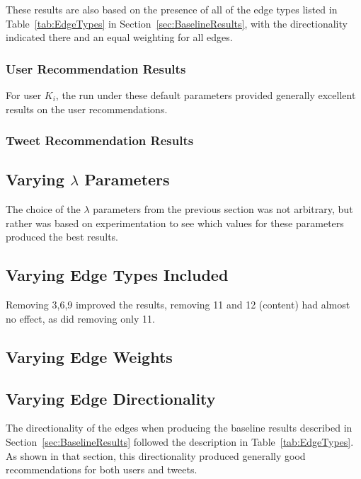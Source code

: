These results are also based on the presence of all of the edge types listed in Table~\ref{tab:EdgeTypes} in Section~\ref{sec:BaselineResults}, with the directionality indicated there and an equal weighting for all edges.

\subsubsection{User Recommendation Results}

For user $K_{i}$, the run under these default parameters provided generally excellent results on the user recommendations. 

\subsubsection{Tweet Recommendation Results}


\subsection{Varying $\lambda$ Parameters}
\label{sec:VaryingLambda}

The choice of the $\lambda$ parameters from the previous section was not arbitrary, but rather was based on experimentation to see which values for these parameters produced the best results.

\subsection{Varying Edge Types Included}

Removing 3,6,9 improved the results, removing 11 and 12 (content) had almost no effect, as did removing only 11.

\subsection{Varying Edge Weights}

\subsection{Varying Edge Directionality}
\label{sec:VaryingEdgeDirectionality}

The directionality of the edges when producing the baseline results described in Section~\ref{sec:BaselineResults} followed the description in Table~\ref{tab:EdgeTypes}. As shown in that section, this directionality produced generally good recommendations for both users and tweets.

